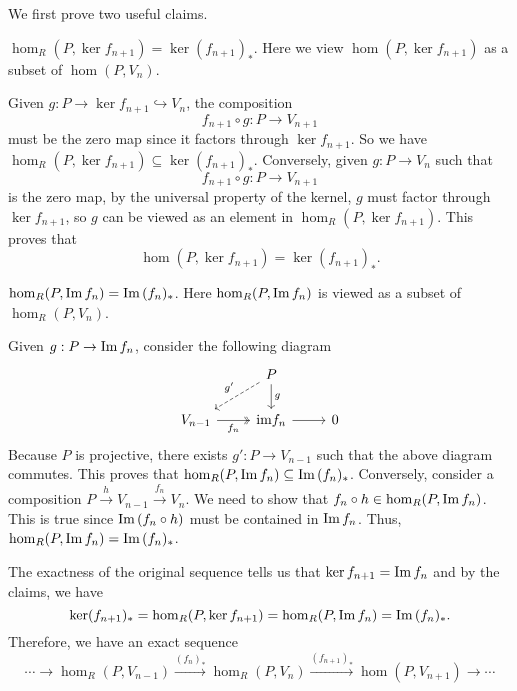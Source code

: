 \documentclass[a4paper, 12pt]{article}
\begin{document}
\begin{solution}
We first prove two useful claims.
\begin{claim}
\(\hom_R(P,\ker f_{n+1})=\ker (f_{n+1})_*\). Here we view \(\hom(P,\ker f_{n+1})\) as a subset of \(\hom(P,V_n)\).
\end{claim}
\begin{claimproof}
Given \(g:P\rightarrow \ker f_{n+1}\hookrightarrow V_n\), the composition 
\[f_{n+1}\circ g:P\rightarrow V_{n+1}\]
must be the zero map since it factors through \(\ker f_{n+1}\). So we have \(\hom_R(P,\ker f_{n+1})\subseteq \ker (f_{n+1})_*\). Conversely, given \(g:P\rightarrow V_n\) such that 
\[f_{n+1}\circ g:P\rightarrow V_{n+1}\] 
is the zero map, by the universal property of the kernel, \(g\) must factor through \(\ker f_{n+1}\), so \(g\) can be viewed as an element in \(\hom_R(P,\ker f_{n+1})\). This proves that 
\[\hom(P,\ker f_{n+1})=\ker (f_{n+1})_*.\]
\end{claimproof}
\begin{claim}
\(\hom_R(P,\text{Im}\, f_n)=\text{Im}\, (f_n)_*\). Here \(\hom_R(P,\text{Im}\, f_n)\) is viewed as a subset of \(\hom_R(P,V_n)\).
\end{claim}
\begin{claimproof}
Given \(g:P\rightarrow \text{Im}\, f_n\), consider the following diagram 
\[\begin{tikzcd}
	& P \\
	{V_{n-1}} & {\text{im}f_n} & 0
	\arrow["{g'}"', dashed, from=1-2, to=2-1]
	\arrow["g", from=1-2, to=2-2]
	\arrow["{f_n}"', two heads, from=2-1, to=2-2]
	\arrow[from=2-2, to=2-3]
\end{tikzcd}\]
Because \(P\) is projective, there exists \(g':P\rightarrow V_{n-1}\) such that the above diagram commutes. 
This proves that \(\hom_R(P,\text{Im}\, f_n)\subseteq \text{Im}\, (f_n)_*\). Conversely, consider a composition \(P\xrightarrow{h}V_{n-1}\xrightarrow{f_n}V_n\). We need to show that \(f_n\circ h\in \hom_R(P,\text{Im}\, f_n)\). This is true since 
\(\text{Im}\,(f_n\circ h)\) must be contained in \(\text{Im}\, f_n\). Thus, \(\hom_R(P,\text{Im}\, f_n)=\text{Im}\, (f_n)_*\).
\end{claimproof}

The exactness of the original sequence tells us that \(\ker f_{n+1}=\text{Im}\, f_n\) and by the claims, we have 
\[\ker(f_{n+1})_*= \hom_R(P,\ker f_{n+1})=\hom_R(P, \text{Im}\, f_n)=\text{Im}\, (f_n)_*.\]
Therefore, we have an exact sequence 
\[\cdots\rightarrow\hom_R(P,V_{n-1})\xrightarrow{(f_n)_*}\hom_R(P,V_n)\xrightarrow{(f_{n+1})_*}\hom(P,V_{n+1})\rightarrow\cdots\]
\end{solution}
\end{document}
